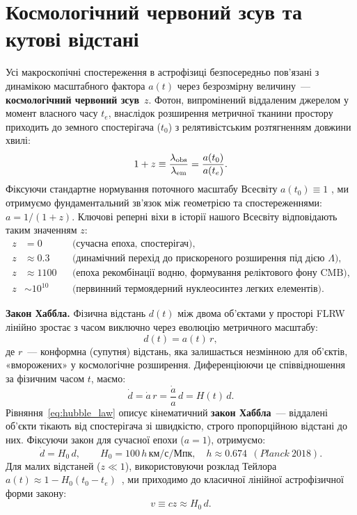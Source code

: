 \section{Космологічний червоний зсув та кутові відстані}
\label{sec:redshift_distances}

Усі макроскопічні спостереження в астрофізиці безпосередньо пов'язані з динамікою масштабного фактора $a(t)$ через безрозмірну величину~--- \textbf{космологічний червоний зсув}~$z$. Фотон, випромінений віддаленим джерелом у момент власного часу $t_e$, внаслідок розширення метричної тканини простору приходить до земного спостерігача ($t_0$) з релятивістським розтягненням довжини хвилі:
\begin{equation}\label{eq:redshift}
  1 + z \equiv \frac{\lambda_{\rm obs}}{\lambda_{\rm em}} = \frac{a(t_0)}{a(t_e)}.
\end{equation}
Фіксуючи стандартне нормування поточного масштабу Всесвіту $a(t_0) \equiv 1$ , ми отримуємо фундаментальний зв'язок між геометрією та спостереженнями: $a = 1/(1+z)$. Ключові реперні віхи в історії нашого Всесвіту відповідають таким значенням $z$:
\begin{align*}
  z &= 0 && \text{(сучасна епоха, спостерігач)}, \\
  z &\approx 0.3 && \text{(динамічний перехід до прискореного розширення під дією $\Lambda$)}, \\
  z &\approx 1100 && \text{(епоха рекомбінації водню, формування реліктового фону CMB)}, \\
  z &\sim 10^{10} && \text{(первинний термоядерний нуклеосинтез легких елементів)}.
\end{align*}

\textbf{Закон Хаббла.} Фізична відстань $d(t)$ між двома об'єктами у просторі FLRW лінійно зростає з часом виключно через еволюцію метричного масштабу:
\[
  d(t) = a(t)\,r,
\]
де $r$~--- конформна (супутня) відстань, яка залишається незмінною для об'єктів, «вморожених» у космологічне розширення. Диференціюючи це співвідношення за фізичним часом $t$, маємо:
\begin{equation}\label{eq:hubble_law}
  \dot{d} = \dot{a}\,r = \frac{\dot{a}}{a}\,d = H(t)\,d.
\end{equation}
Рівняння~\eqref{eq:hubble_law} описує кінематичний \textbf{закон Хаббла}~--- віддалені об'єкти тікають від спостерігача зі швидкістю, строго пропорційною відстані до них. Фіксуючи закон для сучасної епохи ($a = 1$), отримуємо:
\[
  \dot{d} = H_0\,d, \qquad H_0 = 100\,h\,\text{км/с/Мпк}, \quad h \approx 0.674\ \ (\textit{Planck}\ \text{2018}).
\]
Для малих відстаней ($z \ll 1$), використовуючи розклад Тейлора $a(t) \approx 1 - H_0(t_0 - t_e)$~\cite{Weinberg2008}, ми приходимо до класичної лінійної астрофізичної форми закону:
\[
  v \equiv cz \approx H_0\,d.
\]

